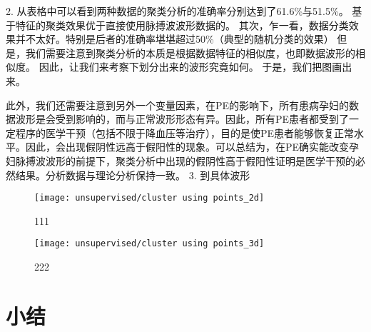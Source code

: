 2.	从表格中可以看到两种数据的聚类分析的准确率分别达到了61.6\%与51.5\%。
基于特征的聚类效果优于直接使用脉搏波波形数据的。
其次，乍一看，数据分类效果并不太好。特别是后者的准确率堪堪超过50\%（典型的随机分类的效果）
但是，我们需要注意到聚类分析的本质是根据数据特征的相似度，也即数据波形的相似度。
因此，让我们来考察下划分出来的波形究竟如何。
于是，我们把图画出来。

此外，我们还需要注意到另外一个变量因素，在PE的影响下，所有患病孕妇的数据波形是会受到影响的，而与正常波形形态有异。因此，所有PE患者都受到了一定程序的医学干预（包括不限于降血压等治疗），目的是使PE患者能够恢复正常水平。因此，会出现假阴性远高于假阳性的现象。可以总结为，在PE确实能改变孕妇脉搏波波形的前提下，聚类分析中出现的假阴性高于假阳性证明是医学干预的必然结果。分析数据与理论分析保持一致。
3.	到具体波形

\begin{figure}[htbp]
    \centering
    \texttt{[image: unsupervised/cluster using points\_2d]}
    \caption[]{\label{fig:cluster2d}111}
\end{figure}
\begin{figure}[htbp]
    \centering
    \texttt{[image: unsupervised/cluster using points\_3d]}
    \caption[]{\label{fig:cluster3d}222}
\end{figure}
\section{小结}